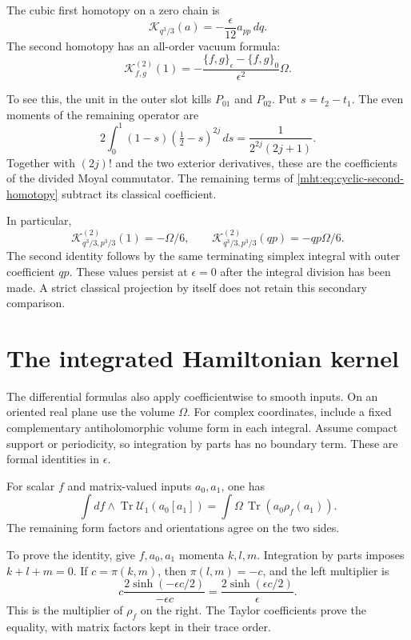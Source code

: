 The cubic first homotopy on a zero chain is
\[
 \mathcal K_{q^3/3}(a)=-\frac{\epsilon}{12}a_{pp}\,dq.
\]
The second homotopy has an all-order vacuum formula:
\begin{equation}\label{mht:eq:cyclic-secondary-vacuum}
 \mathcal K^{(2)}_{f,g}(1)
 =-\frac{\{f,g\}_\epsilon-\{f,g\}_0}{\epsilon^2}\Omega.
\end{equation}

To see this, the unit in the outer slot kills $P_{01}$
and $P_{02}$. Put $s=t_2-t_1$. The even moments of the
remaining operator are
\[
 2\int_0^1(1-s)(\tfrac12-s)^{2j}\,ds
       =\frac1{2^{2j}(2j+1)}.
\]
Together with $(2j)!$ and the two exterior derivatives,
these are the coefficients of the divided Moyal commutator.
The remaining terms of \eqref{mht:eq:cyclic-second-homotopy}
subtract its classical coefficient.

In particular,
\[
 \mathcal K^{(2)}_{q^3/3,p^3/3}(1)=-\Omega/6,
 \qquad
 \mathcal K^{(2)}_{q^3/3,p^3/3}(qp)=-qp\Omega/6.
\]
The second identity follows by the same terminating
simplex integral with outer coefficient $qp$.
These values persist at $\epsilon=0$ after the integral
division has been made. A strict classical projection by
itself does not retain this secondary comparison.

\section{The integrated Hamiltonian kernel}

The differential formulas also apply coefficientwise to smooth
inputs. On an oriented real plane use the volume $\Omega$.
For complex coordinates, include a fixed complementary
antiholomorphic volume form in each integral. Assume compact
support or periodicity, so integration by parts has no boundary
term. These are formal identities in $\epsilon$.

For scalar $f$ and matrix-valued inputs $a_0,a_1$, one has
\begin{equation}\label{mht:eq:integrated-cyclic-kernel}
 \int df\wedge\operatorname{Tr}\mathcal U_1(a_0[a_1])
     =\int\Omega\,\operatorname{Tr}(a_0\rho_f(a_1)).
\end{equation}
The remaining form factors and orientations agree on the two
sides.

To prove the identity, give $f,a_0,a_1$ momenta $k,l,m$.
Integration by parts imposes $k+l+m=0$.
If $c=\pi(k,m)$, then $\pi(l,m)=-c$, and the left multiplier is
\[
 c\frac{2\sinh(-\epsilon c/2)}{-\epsilon c}
     =\frac{2\sinh(\epsilon c/2)}{\epsilon}.
\]
This is the multiplier of $\rho_f$ on the right.
The Taylor coefficients prove the equality, with matrix
factors kept in their trace order.

